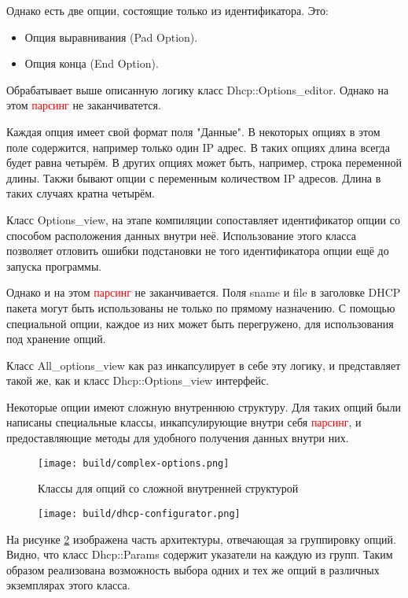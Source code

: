 \documentclass[14pt]{extarticle}
\begin{document}
Однако есть две опции, состоящие только из идентификатора. Это:
\begin{itemize}
    \item Опция выравнивания (Pad Option).
    \item Опция конца (End Option).
\end{itemize}

Обрабатывает выше описанную логику класс Dhcp::Options\_editor. Однако на этом \textcolor{red}{парсинг} не заканчиватется.

Каждая опция имеет свой формат поля "Данные". В некоторых опциях в этом поле содержится, например только один IP адрес. В таких опциях длина всегда будет равна четырём. В других опциях может быть, например, строка переменной длины. Такжи бывают опции с переменным количеством IP адресов. Длина в таких случаях кратна четырём.

Класс Options\_view, на этапе компиляции сопоставляет идентификатор опции со способом расположения данных внутри неё. Использование этого класса позволяет отловить ошибки подстановки не того идентификатора опции ещё до запуска программы.

Однако и на этом \textcolor{red}{парсинг} не заканчивается.
Поля sname и file в заголовке DHCP пакета могут быть использованы не только по прямому назначению. С помощью специальной опции, каждое из них может быть перегружено, для использования под хранение опций.

Класс All\_options\_view как раз инкапсулирует в себе эту логику, и представляет такой же, как и класс Dhcp::Options\_view интерфейс.

Некоторые опции имеют сложную внутреннюю структуру. Для таких опций были написаны специальные классы, инкапсулирующие внутри себя \textcolor{red}{парсинг}, и предоставляющие методы для удобного получения данных внутри них.

\begin{figure}[H]
    \centering
    \texttt{[image: build/complex-options.png]}
    \caption{Классы для опций со сложной внутренней структурой}
    \label{fig:complex_options}
\end{figure}

\begin{figure}[H]
    \texttt{[image: build/dhcp-configurator.png]}
    \caption{}
    \label{fig:profiles}
\end{figure}

На рисунке \ref{fig:profiles} изображена часть архитектуры, отвечающая за группировку опций.
Видно, что класс Dhcp::Params содержит указатели на каждую из групп. Таким образом реализована возможность выбора одних и тех же опций в различных экземплярах этого класса.
\end{document}
